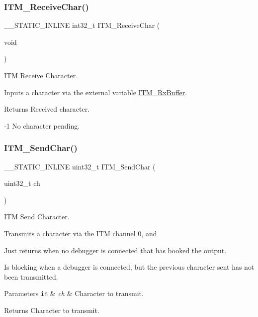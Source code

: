 \subsubsection{\texorpdfstring{I\+T\+M\+\_\+\+Receive\+Char()}{ITM\_ReceiveChar()}}
{\footnotesize\ttfamily \+\_\+\+\_\+\+S\+T\+A\+T\+I\+C\+\_\+\+I\+N\+L\+I\+NE int32\+\_\+t I\+T\+M\+\_\+\+Receive\+Char (\begin{DoxyParamCaption}\item[{void}]{ }\end{DoxyParamCaption})}



I\+TM Receive Character. 

Inputs a character via the external variable \mbox{\hyperlink{group___c_m_s_i_s__core___debug_functions_ga12e68e55a7badc271b948d6c7230b2a8}{I\+T\+M\+\_\+\+Rx\+Buffer}}. \begin{DoxyReturn}{Returns}
Received character. 

-\/1 No character pending. 
\end{DoxyReturn}
\mbox{\label{group___c_m_s_i_s__core___debug_functions_gac90a497bd64286b84552c2c553d3419e}} 
\subsubsection{\texorpdfstring{I\+T\+M\+\_\+\+Send\+Char()}{ITM\_SendChar()}}
{\footnotesize\ttfamily \+\_\+\+\_\+\+S\+T\+A\+T\+I\+C\+\_\+\+I\+N\+L\+I\+NE uint32\+\_\+t I\+T\+M\+\_\+\+Send\+Char (\begin{DoxyParamCaption}\item[{uint32\+\_\+t}]{ch }\end{DoxyParamCaption})}



I\+TM Send Character. 

Transmits a character via the I\+TM channel 0, and \begin{DoxyItemize}
\item Just returns when no debugger is connected that has booked the output. \item Is blocking when a debugger is connected, but the previous character sent has not been transmitted. 
\begin{DoxyParams}[1]{Parameters}
\mbox{\tt in}  & {\em ch} & Character to transmit. \\
\hline
\end{DoxyParams}
\begin{DoxyReturn}{Returns}
Character to transmit. 
\end{DoxyReturn}
\end{DoxyItemize}


